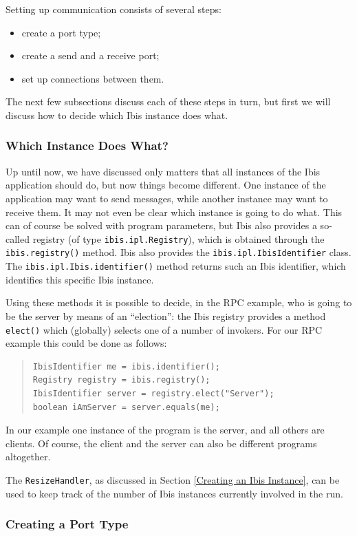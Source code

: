 \documentclass[10pt]{article}
\newcommand{\mysubsubsection}[1]{\subsubsection{#1}\label{#1}}
\begin{document}
Setting up communication consists of several steps:
\begin{itemize}
\item
create a port type;
\item
create a send and a receive port;
\item
set up connections between them.
\end{itemize}

\noindent
The next few subsections discuss each of these steps in turn, but
first we will discuss how to decide which Ibis instance does what.

\mysubsubsection{Which Instance Does What?}

Up until now, we have discussed only matters that all instances of
the Ibis application should do, but now things become different.
One instance of the application may want to send messages, while
another instance may want to receive them.
It may not even be clear which instance is going to do what.
This can of course be solved with program parameters, but Ibis
also provides a so-called registry (of type
\texttt{ibis.ipl.Registry}), which is obtained through the
\texttt{ibis.registry()} method.
Ibis also provides the \texttt{ibis.ipl.IbisIdentifier} class.
The \texttt{ibis.ipl.Ibis.identifier()} method returns such an
Ibis identifier, which identifies this specific Ibis instance.

Using these methods it is possible to decide, in the RPC example,
who is going to be the server by means of an ``election'': the Ibis
registry provides a method \texttt{elect()} which (globally) selects
one of a number of invokers.  For our RPC example this could be done as
follows:

\begin{quote}
\begin{verbatim}
IbisIdentifier me = ibis.identifier();
Registry registry = ibis.registry();
IbisIdentifier server = registry.elect("Server");
boolean iAmServer = server.equals(me);
\end{verbatim}
\end{quote}

In our example one instance of the program is the server, and all
others are clients.  Of course, the client and the server can also
be different programs altogether.

The \texttt{ResizeHandler}, as discussed in Section
\ref{Creating an Ibis Instance}, can be used to keep track of the number
of Ibis instances currently involved in the run.

\subsubsection{Creating a Port Type}
\end{document}
